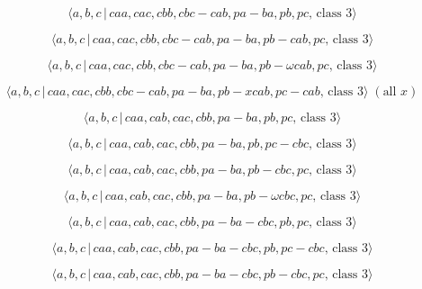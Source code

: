 \documentclass[10pt]{article}
\begin{document}
\begin{equation}
\langle a,b,c\,|\,caa,cac,cbb,cbc-cab,pa-ba,pb,pc,\,\text{class }3\rangle 
\tag{7.1266}
\end{equation}

\begin{equation}
\langle a,b,c\,|\,caa,cac,cbb,cbc-cab,pa-ba,pb-cab,pc,\,\text{class }3\rangle
\tag{7.1267}
\end{equation}

\begin{equation}
\langle a,b,c\,|\,caa,cac,cbb,cbc-cab,pa-ba,pb-\omega cab,pc,\,\text{class }%
3\rangle  \tag{7.1268}
\end{equation}

\begin{equation}
\langle a,b,c\,|\,caa,cac,cbb,cbc-cab,pa-ba,pb-xcab,pc-cab,\,\text{class }%
3\rangle \;(\text{all }x)  \tag{7.1269}
\end{equation}

\begin{equation}
\langle a,b,c\,|\,caa,cab,cac,cbb,pa-ba,pb,pc,\,\text{class }3\rangle 
\tag{7.1270}
\end{equation}

\begin{equation}
\langle a,b,c\,|\,caa,cab,cac,cbb,pa-ba,pb,pc-cbc,\,\text{class }3\rangle 
\tag{7.1271}
\end{equation}

\begin{equation}
\langle a,b,c\,|\,caa,cab,cac,cbb,pa-ba,pb-cbc,pc,\,\text{class }3\rangle 
\tag{7.1272}
\end{equation}

\begin{equation}
\langle a,b,c\,|\,caa,cab,cac,cbb,pa-ba,pb-\omega cbc,pc,\,\text{class }%
3\rangle  \tag{7.1273}
\end{equation}

\begin{equation}
\langle a,b,c\,|\,caa,cab,cac,cbb,pa-ba-cbc,pb,pc,\,\text{class }3\rangle 
\tag{7.1274}
\end{equation}

\begin{equation}
\langle a,b,c\,|\,caa,cab,cac,cbb,pa-ba-cbc,pb,pc-cbc,\,\text{class }3\rangle
\tag{7.1275}
\end{equation}

\begin{equation}
\langle a,b,c\,|\,caa,cab,cac,cbb,pa-ba-cbc,pb-cbc,pc,\,\text{class }3\rangle
\tag{7.1276}
\end{equation}
\end{document}
